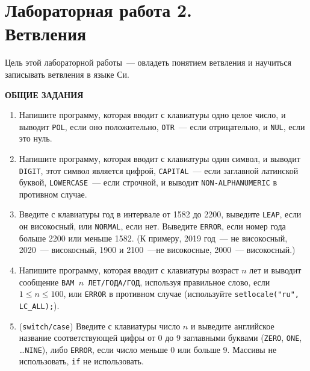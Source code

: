 \documentclass{article}
\begin{document}
\section*{{\normalsize Лабораторная работа 2.} \\Ветвления}

Цель этой лабораторной работы~--- овладеть понятием ветвления и научиться записывать ветвления в языке Си. 

\bigskip
\hfill\textbf{ОБЩИЕ ЗАДАНИЯ}\hfill{~}
\smallskip
\sloppy

\begin{enumerate}
\item
Напишите программу, которая вводит с клавиатуры одно целое число, и выводит \texttt{POL}, если оно положительно, \texttt{OTR}~--- если отрицательно, и \texttt{NUL}, если это нуль.

\item 
Напишите программу, которая вводит с клавиатуры один символ, и выводит \texttt{DIGIT}, этот символ является цифрой, \texttt{CAPITAL}~--- если заглавной латинской буквой, \texttt{LOWERCASE}~--- если строчной, и выводит \texttt{NON-ALPHANUMERIC} в противном случае.

\item
Введите с клавиатуры год в интервале от 1582 до 2200, выведите \texttt{LEAP}, если он високосный, или \texttt{NORMAL}, если нет. Выведите \texttt{ERROR}, если номер года больше 2200 или меньше 1582. (К примеру, 2019 год~--- не високосный, 2020~--- високосный, 1900 и 2100~---не високосные, 2000~--- високосный.)

\item
Напишите программу, которая вводит с клавиатуры возраст $n$ лет и выводит сообщение \texttt{ВАМ $n$ ЛЕТ/ГОДА/ГОД}, используя правильное слово, если $1 \leqslant n \leqslant 100$, или  \texttt{ERROR} в противном случае 
(используйте \texttt{setlocale("ru"{}, LC\_ALL);}).

\item
(\texttt{switch/case}) Введите с клавиатуры число $n$ и выведите английское название соответствующей цифры от 0 до 9 заглавными буквами (\texttt{ZERO}, \texttt{ONE}, \ldots \texttt{NINE}), либо \texttt{ERROR}, если число меньше 0 или больше 9. Массивы не использовать, \texttt{if} не использовать.
\end{enumerate}
\end{document}
